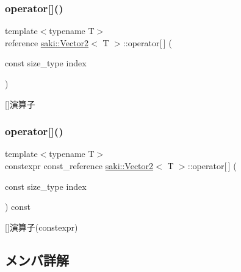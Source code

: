 \subsubsection{\texorpdfstring{operator[]()}{operator[]()}\hspace{0.1cm}{\footnotesize\ttfamily [1/2]}}
{\footnotesize\ttfamily template$<$typename T$>$ \\
reference \mbox{\hyperlink{classsaki_1_1_vector2}{saki\+::\+Vector2}}$<$ T $>$\+::operator\mbox{[}$\,$\mbox{]} (\begin{DoxyParamCaption}\item[{const size\+\_\+type}]{index }\end{DoxyParamCaption})\hspace{0.3cm}{\ttfamily [inline]}}



\mbox{[}\mbox{]}演算子 

\mbox{\label{classsaki_1_1_vector2_a8b2729917f50b5ba02005e3cccc60856}} 
\subsubsection{\texorpdfstring{operator[]()}{operator[]()}\hspace{0.1cm}{\footnotesize\ttfamily [2/2]}}
{\footnotesize\ttfamily template$<$typename T$>$ \\
constexpr const\+\_\+reference \mbox{\hyperlink{classsaki_1_1_vector2}{saki\+::\+Vector2}}$<$ T $>$\+::operator\mbox{[}$\,$\mbox{]} (\begin{DoxyParamCaption}\item[{const size\+\_\+type}]{index }\end{DoxyParamCaption}) const\hspace{0.3cm}{\ttfamily [inline]}}



\mbox{[}\mbox{]}演算子(constexpr) 



\subsection{メンバ詳解}
\mbox{\label{classsaki_1_1_vector2_a49033472256ec3e82f70e429175e08e4}} 
